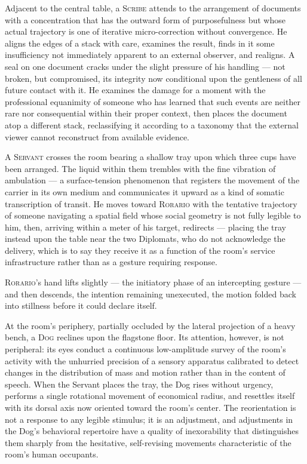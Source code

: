 \documentclass[12pt, oneside]{article}
\newenvironment{action}{%
  \vspace{0.6em}%
  \noindent\ignorespaces%
}{%
  \par\vspace{0.6em}%
}
\begin{document}
\begin{action}
Adjacent to the central table, a \textsc{Scribe} attends to the arrangement of documents with a concentration that has the outward form of purposefulness but whose actual trajectory is one of iterative micro-correction without convergence. He aligns the edges of a stack with care, examines the result, finds in it some insufficiency not immediately apparent to an external observer, and realigns. A seal on one document cracks under the slight pressure of his handling --- not broken, but compromised, its integrity now conditional upon the gentleness of all future contact with it. He examines the damage for a moment with the professional equanimity of someone who has learned that such events are neither rare nor consequential within their proper context, then places the document atop a different stack, reclassifying it according to a taxonomy that the external viewer cannot reconstruct from available evidence.
\end{action}

\begin{action}
A \textsc{Servant} crosses the room bearing a shallow tray upon which three cups have been arranged. The liquid within them trembles with the fine vibration of ambulation --- a surface-tension phenomenon that registers the movement of the carrier in its own medium and communicates it upward as a kind of somatic transcription of transit. He moves toward \textsc{Rorario} with the tentative trajectory of someone navigating a spatial field whose social geometry is not fully legible to him, then, arriving within a meter of his target, redirects --- placing the tray instead upon the table near the two Diplomats, who do not acknowledge the delivery, which is to say they receive it as a function of the room's service infrastructure rather than as a gesture requiring response.

\textsc{Rorario}'s hand lifts slightly --- the initiatory phase of an intercepting gesture --- and then descends, the intention remaining unexecuted, the motion folded back into stillness before it could declare itself.
\end{action}

\begin{action}
At the room's periphery, partially occluded by the lateral projection of a heavy bench, a \textsc{Dog} reclines upon the flagstone floor. Its attention, however, is not peripheral: its eyes conduct a continuous low-amplitude survey of the room's activity with the unhurried precision of a sensory apparatus calibrated to detect changes in the distribution of mass and motion rather than in the content of speech. When the Servant places the tray, the Dog rises without urgency, performs a single rotational movement of economical radius, and resettles itself with its dorsal axis now oriented toward the room's center. The reorientation is not a response to any legible stimulus; it is an adjustment, and adjustments in the Dog's behavioral repertoire have a quality of inexorability that distinguishes them sharply from the hesitative, self-revising movements characteristic of the room's human occupants.
\end{action}
\end{document}
